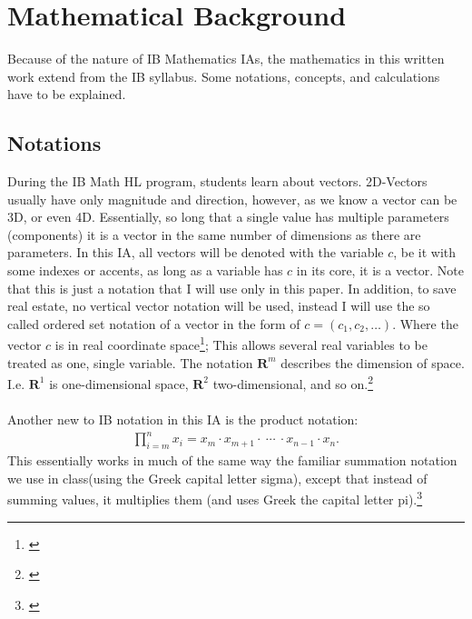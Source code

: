 \section{Mathematical Background}
Because of the nature of IB Mathematics IAs, the mathematics in this written work extend from the IB syllabus. Some notations, concepts, and calculations have to be explained. 

\subsection{Notations}
During the IB Math HL program, students learn about vectors. 2D-Vectors usually have only magnitude and direction, however, as we know a vector can be 3D, or even 4D. Essentially, so long that a single value has multiple parameters (components) it is a vector in the same number of dimensions as there are parameters. In this IA, all vectors will be denoted with the variable $c$, be it with some indexes or accents, as long as a variable has $c$ in its core, it is a vector. Note that this is just a notation that I will use only in this paper. In addition, to save real estate, no vertical vector notation will be used, instead I will use the so called ordered set notation of a vector in the form of $c=(c_{1},c_{2},\dots)$. Where the vector ${c}$ is in real coordinate space\footnote{\cite{kelley_1995}}; This allows several real variables to be treated as one, single variable. The notation $\boldsymbol{R}^{m}$ describes the dimension of space. I.e. $\boldsymbol{R}^{1}$ is one-dimensional space, $\boldsymbol{R}^{2}$ two-dimensional, and so on.\footnote{\cite{Weisstein_2014}} \\
\\
Another new to IB notation in this IA is the product notation:
\begin{gather*}
\prod\limits_{i = m}^{n} x_{i} = x_{m} \cdot x_{m+1} \cdot \  \cdots \  \cdot x_{n-1} \cdot x_{n}.
\end{gather*}
This essentially works in much of the same way the familiar summation notation we use in class(using the Greek capital letter sigma), except that instead of summing values, it multiplies them (and uses Greek the capital letter pi).\footnote{\cite{product_1995}}
